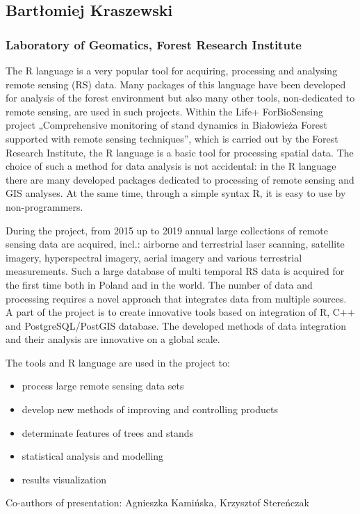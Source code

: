 \documentclass [12pt]{article}
\begin{document}
\subsection*{Bartłomiej	Kraszewski}
\subsubsection*{Laboratory of Geomatics, Forest Research Institute}

The R language is a very popular tool for acquiring, processing and analysing remote sensing (RS) data. Many packages of this language have been developed for analysis of the forest environment but also many other tools, non-dedicated to remote sensing, are used in such projects. Within the Life+ ForBioSensing project „Comprehensive monitoring of stand dynamics in Białowieża Forest supported with remote sensing techniques”, which is carried out by the Forest Research Institute, the R language is a basic tool for processing spatial data. The choice of such a method for data analysis is not accidental: in the R language there are many developed packages dedicated to processing of remote sensing and GIS analyses. At the same time, through a simple syntax R, it is easy to use by non-programmers.

During the project, from 2015 up to 2019 annual large collections of remote sensing data are acquired, incl.: airborne and terrestrial laser scanning, satellite imagery, hyperspectral imagery, aerial imagery and various terrestrial measurements. Such a large database of multi temporal RS data is acquired for the first time both in Poland and in the world. The number of data and processing requires a novel approach that integrates data from multiple sources. A part of the project is to create innovative tools based on integration of R, C++ and PostgreSQL/PostGIS database. The developed methods of data integration and their analysis are innovative on a global scale.

The tools and R language are used in the project to: 
\begin{itemize}
\setlength\itemsep{.15em}
\item process large remote sensing data sets 
\item develop new methods of improving and controlling products 
\item determinate features of trees and stands
\item statistical analysis and modelling
\item results visualization
\end{itemize}
Co-authors of presentation: Agnieszka Kamińska, Krzysztof Stereńczak
\end{document}
